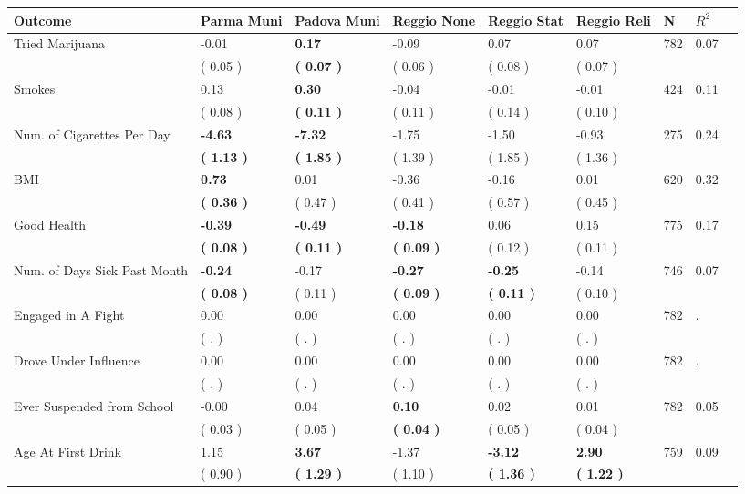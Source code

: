 \begin{tabular}{L{6.2cm} C{1.8cm} C{1.8cm} C{1.8cm} C{1.8cm} C{1.8cm} C{1.8cm} C{0.3cm} C{0.3cm}}
\toprule
 \textbf{Outcome} & \textbf{Parma Muni} & \textbf{Padova Muni} & \textbf{Reggio None} & \textbf{Reggio Stat} & \textbf{Reggio Reli} & \textbf{N} & \textbf{$ R^2$} \\
\midrule
Tried Marijuana &     -0.01 & \textbf{     0.17} &     -0.09 &      0.07 &      0.07  & 782 &       0.07 \\ 
 & (     0.05 ) & \textbf{(     0.07 )} & (     0.06 ) & (     0.08 ) & (     0.07 )  & \\
Smokes &      0.13 & \textbf{     0.30} &     -0.04 &     -0.01 &     -0.01  & 424 &       0.11 \\ 
 & (     0.08 ) & \textbf{(     0.11 )} & (     0.11 ) & (     0.14 ) & (     0.10 )  & \\
Num. of Cigarettes Per Day & \textbf{    -4.63} & \textbf{    -7.32} &     -1.75 &     -1.50 &     -0.93  & 275 &       0.24 \\ 
 & \textbf{(     1.13 )} & \textbf{(     1.85 )} & (     1.39 ) & (     1.85 ) & (     1.36 )  & \\
BMI & \textbf{     0.73} &      0.01 &     -0.36 &     -0.16 &      0.01  & 620 &       0.32 \\ 
 & \textbf{(     0.36 )} & (     0.47 ) & (     0.41 ) & (     0.57 ) & (     0.45 )  & \\
Good Health & \textbf{    -0.39} & \textbf{    -0.49} & \textbf{    -0.18} &      0.06 &      0.15  & 775 &       0.17 \\ 
 & \textbf{(     0.08 )} & \textbf{(     0.11 )} & \textbf{(     0.09 )} & (     0.12 ) & (     0.11 )  & \\
Num. of Days Sick Past Month & \textbf{    -0.24} &     -0.17 & \textbf{    -0.27} & \textbf{    -0.25} &     -0.14  & 746 &       0.07 \\ 
 & \textbf{(     0.08 )} & (     0.11 ) & \textbf{(     0.09 )} & \textbf{(     0.11 )} & (     0.10 )  & \\
Engaged in A Fight &      0.00 &      0.00 &      0.00 &      0.00 &      0.00  & 782 &          . \\ 
 & (        . ) & (        . ) & (        . ) & (        . ) & (        . )  & \\
Drove Under Influence &      0.00 &      0.00 &      0.00 &      0.00 &      0.00  & 782 &          . \\ 
 & (        . ) & (        . ) & (        . ) & (        . ) & (        . )  & \\
Ever Suspended from School &     -0.00 &      0.04 & \textbf{     0.10} &      0.02 &      0.01  & 782 &       0.05 \\ 
 & (     0.03 ) & (     0.05 ) & \textbf{(     0.04 )} & (     0.05 ) & (     0.04 )  & \\
Age At First Drink &      1.15 & \textbf{     3.67} &     -1.37 & \textbf{    -3.12} & \textbf{     2.90}  & 759 &       0.09 \\ 
 & (     0.90 ) & \textbf{(     1.29 )} & (     1.10 ) & \textbf{(     1.36 )} & \textbf{(     1.22 )}  & \\
\bottomrule
\end{tabular}
